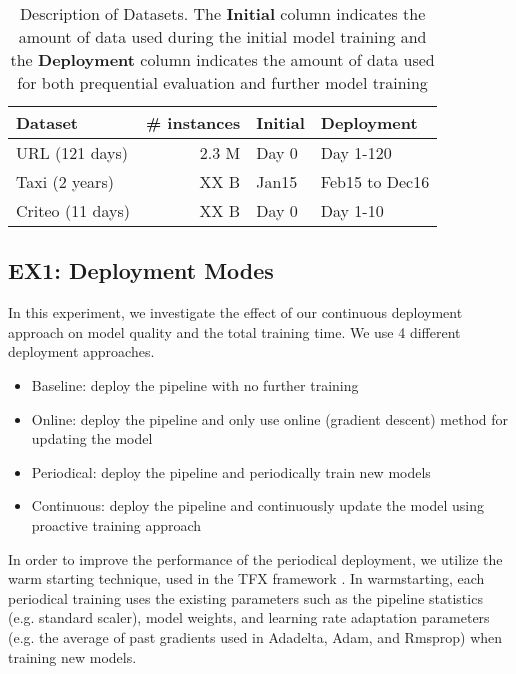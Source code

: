 \begin{table}[h!]
\centering
\begin{tabular}{lrll}
\hline
\textbf{Dataset}  & \textbf{\# instances} & \textbf{Initial} & \textbf{Deployment} \\
\hline
URL (121 days)            & 2.3 M           & Day 0             & Day 1-120          \\
Taxi   (2 years)         & XX B              & Jan15             & Feb15 to Dec16    \\
Criteo  (11 days)        & XX B            & Day 0           & Day 1-10       \\
\hline
\end{tabular}
\caption{Description of Datasets. The \textbf{Initial} column indicates the amount of data used during the initial model training and the \textbf{Deployment} column indicates the amount of data used for both prequential evaluation and further model training}  
\label{dataset-description}
\end{table}


\subsection{EX1: Deployment Modes}
In this experiment, we investigate the effect of our continuous deployment approach on model quality and the total training time.
We use 4 different deployment approaches.
\begin{itemize}
\item Baseline: deploy the pipeline with no further training
\item Online: deploy the pipeline and only use online (gradient descent) method for updating the model
\item Periodical: deploy the pipeline and periodically train new models 
\item Continuous: deploy the pipeline and continuously update the model using proactive training approach
\end{itemize}

In order to improve the performance of the periodical deployment, we utilize the warm starting technique, used in the TFX framework \cite{baylor2017tfx}.
In warmstarting, each periodical training uses the existing parameters such as the pipeline statistics (e.g. standard scaler), model weights, and learning rate adaptation parameters (e.g. the average of past gradients used in Adadelta, Adam, and Rmsprop) when training new models.

